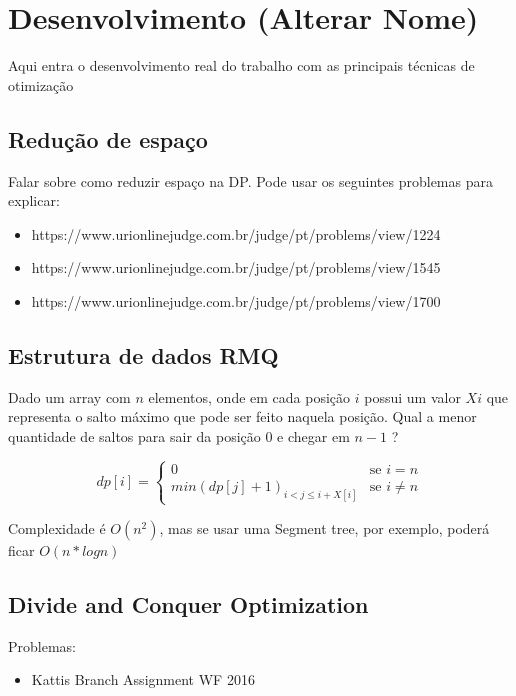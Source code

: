 \chapter{Desenvolvimento (Alterar Nome) }
\label{chap:desenvolvimento}

Aqui entra o desenvolvimento real do trabalho com as principais técnicas de otimização

\section{Redução de espaço}
Falar sobre como reduzir espaço na DP.
Pode usar os seguintes problemas para explicar:
\begin{itemize}
	\item https://www.urionlinejudge.com.br/judge/pt/problems/view/1224
	\item https://www.urionlinejudge.com.br/judge/pt/problems/view/1545
	\item https://www.urionlinejudge.com.br/judge/pt/problems/view/1700
\end{itemize}

\section{Estrutura de dados RMQ}

Dado um array com $n$ elementos, onde em cada posição $i$ possui um valor $Xi$ que representa o salto máximo que pode ser feito naquela posição. Qual a menor quantidade de saltos para sair da posição 0 e chegar em $n-1$ ?

\begin{equation}
dp[i] = 
\begin{cases}
0 &\text{se } i = n \\
min(dp[j] + 1)_{i < j \leq i + X[i]} &\text{se } i \neq n

\end{cases}
\end{equation}

Complexidade é $O(n^2)$, mas se usar uma Segment tree, por exemplo, poderá ficar $O(n*logn)$

\section{Divide and Conquer Optimization}
Problemas:

\begin{itemize}
	\item Kattis Branch Assignment WF 2016
\end{itemize}

